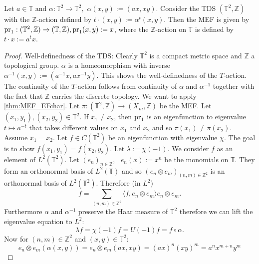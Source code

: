 \begin{proposition}
Let $a \in \mathbb{T}$ and $\alpha: \mathbb{T}^2 \to \mathbb{T}^2,$ $\alpha (x,y) := (ax,xy)$.
  Consider the TDS $(\mathbb{T}^2,\mathbb{Z})$ with the $\mathbb{Z}$-action defined by $t \cdot (x,y) := \alpha^t (x,y)$.
  Then the MEF is given by $\operatorname{pr}_1 : (\mathbb{T}^2,\mathbb{Z}) \to (\mathbb{T},\mathbb{Z}), \operatorname{pr}_1 (x,y) := x$, where the $\mathbb{Z}$-action on $\mathbb{T}$ is defined by $t\cdot  x := a^t x$.
\end{proposition}
\begin{proof}
  Well-definedness of the TDS:
  Clearly $\mathbb{T}^2$ is a compact metric space and $\mathbb{Z}$ a topological group.
  $\alpha$ is a homeomorphism with inverse $\alpha^{-1} (x,y):= (a^{-1} x, a x^{-1} y)$.
  This shows the well-definedness of the $T$-action.
  The continuity of the $T$-action follows from continuity of $\alpha$ and $\alpha^{-1}$ together with the fact that $\mathbb{Z}$ carries the discrete topology.
  We want to apply \cref{thm:MEF_EFchar}.
  Let $\pi : (\mathbb{T}^2 , \mathbb{Z}) \to (X_m, \mathbb{Z})$ be the MEF.
  Let $(x_1, y_1), (x_2, y_2) \in \mathbb{T}^2$.
  If $x_1 \neq x_2$, then $\operatorname{pr}_1$ is an eigenfunction to eigenvalue $t \mapsto a^{-t}$ that takes different values on $x_1$ and $x_2$ and so $\pi(x_1) \neq \pi(x_2)$.
  Assume $x_1 = x_2$.
  Let $f \in C(\mathbb{T}^2)$ be an eigenfunction with eigenvalue $\chi$.
  The goal is to show $f(x_1, y_1) = f(x_2,y_2)$.
  Let $\lambda := \chi (-1)$.
  We consider $f$ as an element of $L^2( \mathbb{T}^2)$.
  Let $(e_n)_{n \in \mathbb{Z}}$, \ $e_n(x):= x^n$ be the monomials on $\mathbb{T}$.
  They form an orthonormal basis of $L^2(\mathbb{T})$ and so $(e_n \otimes e_m)_{(n,m) \in \mathbb{Z}^2}$ is an orthonormal basis of $L^2(\mathbb{T}^2)$.
  Therefore (in $L^2$)
  \begin{equation*}
    f = \sum_{(n,m) \in \mathbb{Z}^2} \langle f, e_n \otimes e_m \rangle e_n \otimes e_m.
  \end{equation*}
  Furthermore $\alpha$ and $\alpha^{-1}$ preserve the Haar measure of $\mathbb{T}^2$ therefore we can lift the eigenvalue equation to $L^2$:
  \begin{equation}
    \label{eq:T2mefEveq}
    \lambda f = \chi(-1) f=  U(-1)f  = f \circ \alpha.
  \end{equation}
  Now for $(n,m) \in \mathbb{Z}^2$ and $(x,y) \in \mathbb{T}^2$:
  \begin{equation*}
    e_n \otimes e_m (\alpha (x,y)) = e_n \otimes e_m (a x, x y) = (ax)^n (xy)^m = a^n x^{m+n} y^m

\end{equation*}
\end{proof}
